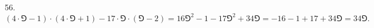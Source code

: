 56. $(4\cdot\Game-1)\cdot(4\cdot\Game+1)-17\cdot\Game\cdot(\Game-2)=16\Game^2-1-17\Game^2+34\Game=-16-1+17+34\Game=34\Game.$\\
